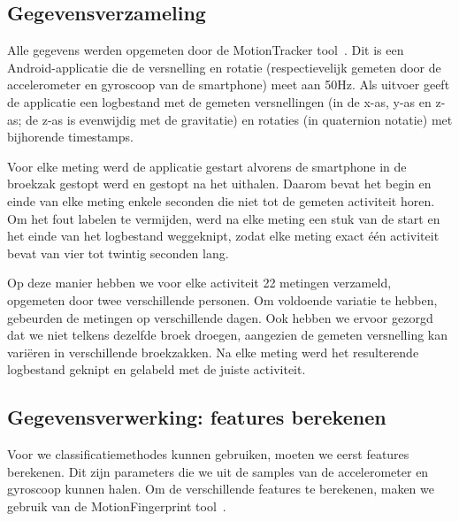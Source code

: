 \documentclass{article}
\begin{document}

\subsection{Gegevensverzameling}

Alle gegevens werden opgemeten door de MotionTracker tool~\cite{meert and schietgat:motiontracker}. %
Dit is een Android-applicatie die de versnelling en rotatie (respectievelijk gemeten door de accelerometer en gyroscoop van de smartphone) meet aan 50Hz.  Als uitvoer geeft de applicatie een logbestand met de gemeten versnellingen (in de x-as, y-as en z-as; de z-as is evenwijdig met de gravitatie) en rotaties (in quaternion notatie) met bijhorende timestamps.

Voor elke meting werd de applicatie gestart alvorens de smartphone in de broekzak gestopt werd en gestopt na het uithalen. Daarom bevat het begin en einde van elke meting enkele seconden die niet tot de gemeten activiteit horen. Om het fout labelen te vermijden, werd na elke meting een stuk van de start en het einde van het logbestand weggeknipt, zodat elke meting exact \'e\'en activiteit bevat van vier tot twintig seconden lang. 

Op deze manier hebben we voor elke activiteit 22 metingen verzameld, opgemeten door twee verschillende personen. Om voldoende variatie te hebben, gebeurden de metingen op verschillende dagen. Ook hebben we ervoor gezorgd dat we niet telkens dezelfde broek droegen, aangezien de gemeten versnelling kan vari\"eren in verschillende broekzakken. Na elke meting werd het resulterende logbestand geknipt en gelabeld met de juiste activiteit.


\subsection{Gegevensverwerking: features berekenen}

Voor we classificatiemethodes kunnen gebruiken, moeten we eerst features berekenen. Dit zijn parameters die we uit de samples van de accelerometer en gyroscoop kunnen halen. Om de verschillende features te berekenen, maken we gebruik van de MotionFingerprint tool~\cite{meert and schietgat:motionfingerprint}. %


\end{document}
